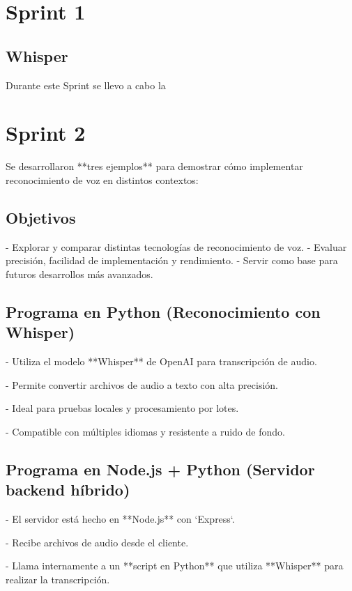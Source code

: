 \documentclass[a4paper, 12pt]{book}
\begin{document}
\section{Sprint 1} 
\label{sec:sprint1}
\subsection{Whisper}
Durante este Sprint se llevo a cabo la 


\section{Sprint 2} 
\label{sec:sprint2}

Se desarrollaron **tres ejemplos** para demostrar cómo implementar reconocimiento de voz en distintos contextos:
\subsection{Objetivos}

- Explorar y comparar distintas tecnologías de reconocimiento de voz.
- Evaluar precisión, facilidad de implementación y rendimiento.
- Servir como base para futuros desarrollos más avanzados.

\subsection{Programa en Python (Reconocimiento con Whisper)}

- Utiliza el modelo **Whisper** de OpenAI para transcripción de audio.

- Permite convertir archivos de audio a texto con alta precisión.

- Ideal para pruebas locales y procesamiento por lotes.

- Compatible con múltiples idiomas y resistente a ruido de fondo.

\subsection{Programa en Node.js + Python (Servidor backend híbrido)}

- El servidor está hecho en **Node.js** con `Express`.

- Recibe archivos de audio desde el cliente.

- Llama internamente a un **script en Python** que utiliza **Whisper** para realizar la transcripción.
\end{document}
